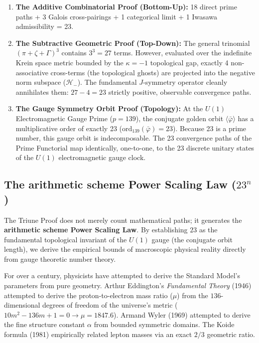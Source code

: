 \begin{enumerate}
    \item \textbf{The Additive Combinatorial Proof (Bottom-Up):} 18 direct prime paths + 3 Galois cross-pairings + 1 categorical limit + 1 Iwasawa admissibility = 23.
    \item \textbf{The Subtractive Geometric Proof (Top-Down):} The general trinomial $({\pi + \zeta + \Gamma})^3$ contains $3^3 = 27$ terms. However, evaluated over the indefinite Krein space metric bounded by the $\kappa = -1$ topological gap, exactly 4 non-associative cross-terms (the topological ghosts) are projected into the negative norm subspace ($\mathcal{H}_-$). The fundamental $J$-symmetry operator cleanly annihilates them: $27 - 4 = 23$ strictly positive, observable convergence paths.
    \item \textbf{The Gauge Symmetry Orbit Proof (Topology):} At the $U(1)$ Electromagnetic Gauge Prime ($p=139$), the conjugate golden orbit $\langle \bar{\varphi} \rangle$ has a multiplicative order of exactly 23 ($\mathrm{ord}_{139}(\bar{\varphi}) = 23$). Because 23 is a prime number, this gauge orbit is indecomposable. The 23 convergence paths of the Prime Functorial map identically, one-to-one, to the 23 discrete unitary states of the $U(1)$ electromagnetic gauge clock.
\end{enumerate}

\subsection{The arithmetic scheme Power Scaling Law ($23^n$)}

The Triune Proof does not merely count mathematical paths; it generates the \textbf{arithmetic scheme Power Scaling Law}. By establishing $23$ as the fundamental topological invariant of the $U(1)$ gauge (the conjugate orbit length), we derive the empirical bounds of macroscopic physical reality directly from gauge theoretic number theory. 

For over a century, physicists have attempted to derive the Standard Model's parameters from pure geometry. Arthur Eddington's \textit{Fundamental Theory} (1946) attempted to derive the proton-to-electron mass ratio ($\mu$) from the $136$-dimensional degrees of freedom of the universe's metric ($10m^2 - 136m + 1 = 0 \rightarrow \mu = 1847.6$). Armand Wyler (1969) attempted to derive the fine structure constant $\alpha$ from bounded symmetric domains. The Koide formula (1981) empirically related lepton masses via an exact $2/3$ geometric ratio. 

